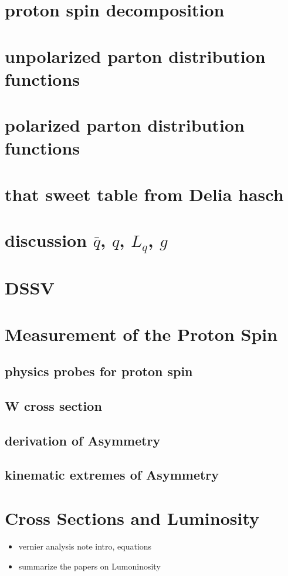 \section{ proton spin decomposition}
\section{ unpolarized parton distribution functions}
\section{ polarized parton distribution functions}
\section{ that sweet table from Delia hasch}
\section{ discussion $\bar{q}$, $q$, $L_q$, $g$}
\section{ DSSV }

\clearpage
\section{Measurement of the Proton Spin}
\subsection{ physics probes for proton spin}
\subsection{ W cross section}
\subsection{ derivation of Asymmetry}
\subsection{ kinematic extremes of Asymmetry}

\clearpage
\section{Cross Sections and Luminosity}
\begin{itemize}
		\item vernier analysis note intro, equations
		\item summarize the papers on Lumoninosity
\end{itemize}

\clearpage
